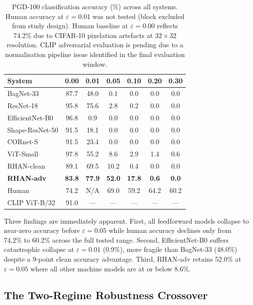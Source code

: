 \documentclass[12pt,a4paper]{article}
\begin{document}
\begin{table}[H]
\centering
\caption{PGD-100 classification accuracy (\%) across all systems.
Human accuracy at $\varepsilon{=}0.01$ was not tested (block excluded from
study design). Human baseline at $\varepsilon{=}0.00$ reflects 74.2\% due to
CIFAR-10 pixelation artefacts at $32{\times}32$ resolution.
CLIP adversarial evaluation is pending due to a normalisation pipeline issue
identified in the final evaluation window.}
\label{tab:pgd_accuracy}
\renewcommand{\arraystretch}{1.25}
\begin{tabularx}{\textwidth}{lCCCCCC}
\toprule
\textbf{System} &
\textbf{0.00} & \textbf{0.01} & \textbf{0.05} &
\textbf{0.10} & \textbf{0.20} & \textbf{0.30} \\
\midrule
BagNet-33        & 87.7 & 48.0 & 0.1  & 0.0  & 0.0  & 0.0  \\
ResNet-18        & 95.8 & 75.6 & 2.8  & 0.2  & 0.0  & 0.0  \\
EfficientNet-B0  & 96.8 & 0.9  & 0.0  & 0.0  & 0.0  & 0.0  \\
Shape-ResNet-50  & 91.5 & 18.1 & 0.0  & 0.0  & 0.0  & 0.0  \\
CORnet-S         & 91.5 & 23.4 & 0.0  & 0.0  & 0.0  & 0.0  \\
ViT-Small        & 97.8 & 55.2 & 8.6  & 2.9  & 1.4  & 0.6  \\
\midrule
RHAN-clean       & 89.1 & 69.5 & 10.2 & 0.4  & 0.0  & 0.0  \\
\textbf{RHAN-adv}& \textbf{83.8} & \textbf{77.9} & \textbf{52.0} &
                   \textbf{17.8} & \textbf{0.6}  & \textbf{0.0}  \\
\midrule
Human            & 74.2 & N/A  & 69.0 & 59.2 & 64.2 & 60.2 \\
CLIP ViT-B/32    & 91.0 & ---  & ---  & ---  & ---  & ---  \\
\bottomrule
\end{tabularx}
\end{table}

Three findings are immediately apparent.
First, all feedforward models collapse to near-zero accuracy before
$\varepsilon{=}0.05$ while human accuracy declines only from 74.2\% to 60.2\%
across the full tested range.
Second, EfficientNet-B0 suffers catastrophic collapse at $\varepsilon{=}0.01$
(0.9\%), more fragile than BagNet-33 (48.0\%) despite a 9-point clean
accuracy advantage.
Third, RHAN-adv retains 52.0\% at $\varepsilon{=}0.05$ where all other
machine models are at or below 8.6\%.

\subsection{The Two-Regime Robustness Crossover}
\end{document}
